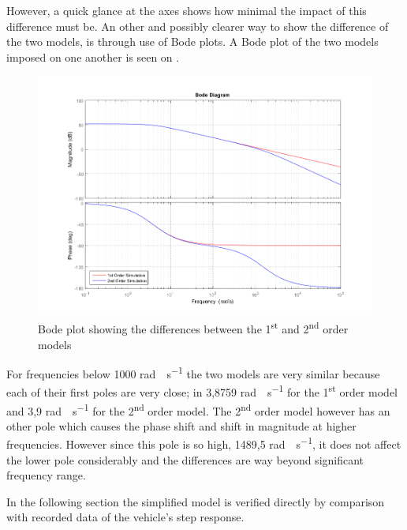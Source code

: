 However, a quick glance at the axes shows how minimal the impact of this difference must be. An other and possibly clearer way to show the difference of the two models, is through use of Bode plots. A Bode plot of the two models imposed on one another is seen on .
%
\begin{figure}[H]
	\centering
	\includegraphics[width = \textwidth]{figures/bodePlotOf1stAnd2ndOrderModel.png}
	\caption{Bode plot showing the differences between the \si{1^{st}} and \si{2^{nd}} order models}
	\label{fig:bodePlotOf1stAnd2ndOrderModel}
\end{figure}
%
For frequencies below 1000 \si{rad\cdot s^{-1}} the two models are very similar because each of their first poles are very close; in 3,8759 \si{rad\cdot s^{-1}} for the \si{1^{st}} order model and 3,9 \si{rad\cdot s^{-1}} for the \si{2^{nd}} order model. The \si{2^{nd}} order model however has an other pole which causes the phase shift and shift in magnitude at higher frequencies. However since this pole is so high, 1489,5 \si{rad\cdot s^{-1}}, it does not affect the lower pole considerably and the differences are way beyond significant frequency range.

In the following section the simplified model is verified directly by comparison with recorded data of the vehicle's step response.